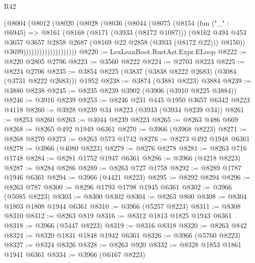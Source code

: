 \begin{lexlean}{R42}
\begin{coremodule}
                          (@8004
                            (@8012
                              (@8020
                                (@8028
                                  (@8036
                                    (@8044
                                      (@8075
                                        (@8154
                                          (fun ("_" : @6945) =>
                                          @8161
                                            (@8168
                                              (@8171 (@3933 (@8172 @1087)))
                                              (@8162
                                                @494
                                                @453
                                                @3657
                                                @3657
                                                @2858
                                                @2687
                                                (@8169 @22 @2858 (@3933 (@8172 @22)))
                                                @8150))
                                            @3699))))))))))))))))))))
@8220 := LexLeanBoot.RustAst.Expr.ELoop
@8222 := @8220 @2805 @2796
@8223 := @3560 @8222
@8224 := @2703 @8223
@8225 := @8224 @2706
@8235 := @3854 @8225 (@3837 (@3838 @8222 @2683) (@3084 (@3731 @8222 @2683))) @1952
@8238 := @3874 (@3881 @8223) @3884
@8239 := @3880 @8238
@8245 := @8235 @8239 @3902 (@3906 (@3910 @8225 @3884))
@8246 := @3916 @8239
@8253 := @8246 @231 @445 @1950 @3657 @6342 @8223 @4118
@8260 := @3928 @8239 @34 @8223 (@3933 (@3934 @8239 @34))
@8261 := @8253 @8260
@8263 := @4044 @8239 @8223
@8265 := @8263 @486 @669
@8268 := @8265 @492 @1949 @6361
@8270 := @3966 (@3968 @8223)
@8271 := @8268 @8270
@8273 := @8263 @573 @1742
@8276 := @8273 @492 @1948 @6361
@8278 := @3966 (@4080 @8223)
@8279 := @8276 @8278
@8281 := @8263 @716 @1748
@8284 := @8281 @1752 @1947 @6361
@8286 := @3966 (@4218 @8223)
@8287 := @8284 @8286
@8289 := @8263 @727 @1758
@8292 := @8289 @1787 @1946 @6361
@8294 := @3966 (@4421 @8223)
@8295 := @8292 @8294
@8296 := @8263 @787
@8300 := @8296 @1793 @1798 @1945 @6361
@8302 := @3966 (@5085 @8223)
@8303 := @8300 @8302
@8304 := @8263 @800
@8308 := @8304 @1803 @1808 @1944 @6361
@8310 := @3966 (@5257 @8223)
@8311 := @8308 @8310
@8312 := @8263 @819
@8316 := @8312 @1813 @1825 @1943 @6361
@8318 := @3966 (@5447 @8223)
@8319 := @8316 @8318
@8320 := @8263 @842
@8324 := @8320 @1831 @1848 @1942 @6361
@8326 := @3966 (@5760 @8223)
@8327 := @8324 @8326
@8328 := @8263 @920
@8332 := @8328 @1853 @1861 @1941 @6361
@8334 := @3966 (@6167 @8223)

\end{coremodule}
\end{lexlean}
